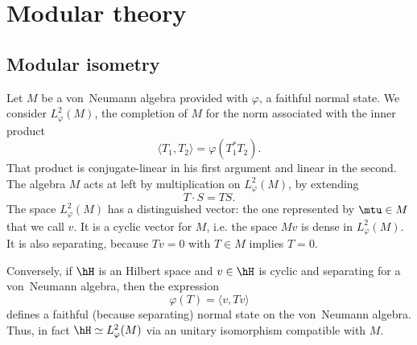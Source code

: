 
\section{Modular theory}

\subsection{Modular isometry}

Let $M$ be a von~Neumann algebra provided with $\varphi$, a faithful normal state. We consider $L_{\varphi}^2(M)$, the completion of $M$ for the norm associated with the inner product
\begin{equation}
	\langle T_1, T_2\rangle =\varphi(T^*_1T_2).
\end{equation}
That product is conjugate-linear in his first argument and linear in the second. The algebra $M$ acts at left by multiplication on $L_{\varphi}^2(M)$, by extending
\begin{equation}
	T\cdot S = TS.
\end{equation}
The space $L_{\varphi}^2(M)$ has a distinguished vector: the one represented by $\mtu\in M$ that we call $v$. It is a cyclic vector for $M$, i.e. the space $Mv$ is dense in $ L_{\varphi}^2(M)$. It is also separating, because $Tv=0$ with $T\in M$ implies $T=0$.

Conversely, if $\hH$ is an Hilbert space and $v\in\hH$ is cyclic and separating for a von~Neumann algebra, then the expression
\begin{equation}
	\varphi(T)=\langle v, Tv\rangle
\end{equation}
defines a faithful (because separating) normal state on the von~Neumann algebra. Thus, in fact $\hH\simeq  L_{\varphi}^2(M)$ via an unitary isomorphism compatible with $M$.

